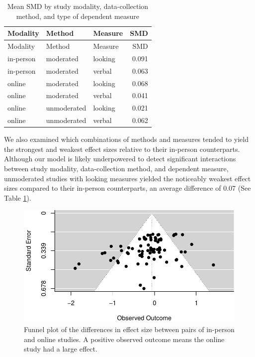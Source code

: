 \documentclass[
  man,floatsintext]{apa6}
\begin{document}
\begin{longtable}[]{@{}lllr@{}}
\caption{\label{tab:ecoeffs}Mean SMD by study modality, data-collection method, and type of dependent measure}\tabularnewline
\toprule()
Modality & Method & Measure & SMD \\
\midrule()
\endfirsthead
\toprule()
Modality & Method & Measure & SMD \\
\midrule()
\endhead
in-person & moderated & looking & 0.091 \\
in-person & moderated & verbal & 0.063 \\
online & moderated & looking & 0.068 \\
online & moderated & verbal & 0.041 \\
online & unmoderated & looking & 0.021 \\
online & unmoderated & verbal & 0.062 \\
\bottomrule()
\end{longtable}

We also examined which combinations of methods and measures tended to yield the strongest and weakest effect sizes relative to their in-person counterparts. Although our model is likely underpowered to detect significant interactions between study modality, data-collection method, and dependent measure, unmoderated studies with looking measures yielded the noticeably weakest effect sizes compared to their in-person counterparts, an average difference of 0.07 (See Table \ref{tab:ecoeffs}).

\begin{figure}[h]

{\centering \includegraphics[width=0.8\linewidth]{OnlineMA_main_files/figure-latex/funnel-1} 

}

\caption{Funnel plot of the differences in effect size between pairs of in-person and online studies. A positive observed outcome means the online study had a large effect. \label{funnel}}\label{fig:funnel}
\end{figure}
\end{document}
